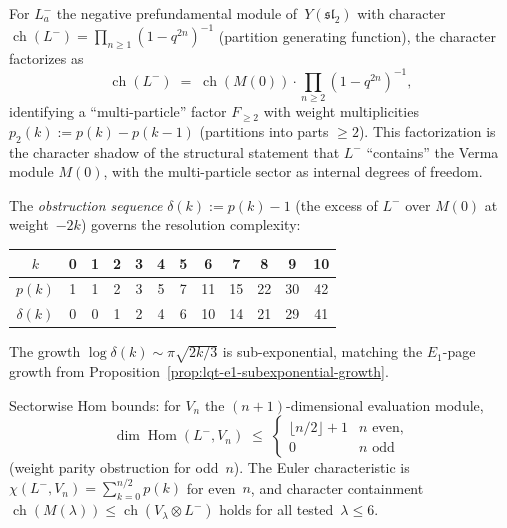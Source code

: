 \begin{computation}
\label{comp:thick-generation-sl2}
For $L^-_a$ the negative prefundamental module of~$Y(\mathfrak{sl}_2)$
with character $\operatorname{ch}(L^-) = \prod_{n \geq 1}(1-q^{2n})^{-1}$
(partition generating function), the character factorizes as
\begin{equation}\label{eq:fock-verma-factorization}
  \operatorname{ch}(L^-)
  \;=\;
  \operatorname{ch}(M(0)) \cdot \prod_{n \geq 2}(1-q^{2n})^{-1},
\end{equation}
identifying a ``multi-particle'' factor $F_{\geq 2}$ with weight
multiplicities $p_2(k) := p(k) - p(k-1)$ (partitions into parts
$\geq 2$).  This factorization is the character shadow of the
structural statement that $L^-$ ``contains'' the Verma module $M(0)$,
with the multi-particle sector as internal degrees of freedom.

The \emph{obstruction sequence} $\delta(k) := p(k) - 1$ (the excess
of $L^-$ over $M(0)$ at weight~$-2k$) governs the resolution
complexity:
\begin{center}
\renewcommand{\arraystretch}{1.1}
\begin{tabular}{c|ccccccccccc}
$k$ & 0 & 1 & 2 & 3 & 4 & 5 & 6 & 7 & 8 & 9 & 10 \\
\hline
$p(k)$ & 1 & 1 & 2 & 3 & 5 & 7 & 11 & 15 & 22 & 30 & 42 \\
$\delta(k)$ & 0 & 0 & 1 & 2 & 4 & 6 & 10 & 14 & 21 & 29 & 41
\end{tabular}
\end{center}
The growth $\log\delta(k) \sim \pi\sqrt{2k/3}$ is
sub-exponential, matching the $E_1$-page growth from
Proposition~\ref{prop:lqt-e1-subexponential-growth}.

Sectorwise Hom bounds: for $V_n$ the $(n{+}1)$-dimensional
evaluation module,
\[
  \dim\operatorname{Hom}(L^-, V_n)
  \;\leq\;
  \begin{cases}
    \lfloor n/2\rfloor + 1 & \text{$n$ even,} \\
    0 & \text{$n$ odd}
  \end{cases}
\]
(weight parity obstruction for odd~$n$).  The Euler characteristic
is $\chi(L^-, V_n) = \sum_{k=0}^{n/2} p(k)$ for even~$n$,
and character containment
$\operatorname{ch}(M(\lambda)) \leq
 \operatorname{ch}(V_\lambda \otimes L^-)$
holds for all tested~$\lambda \leq 6$.

\end{computation}

